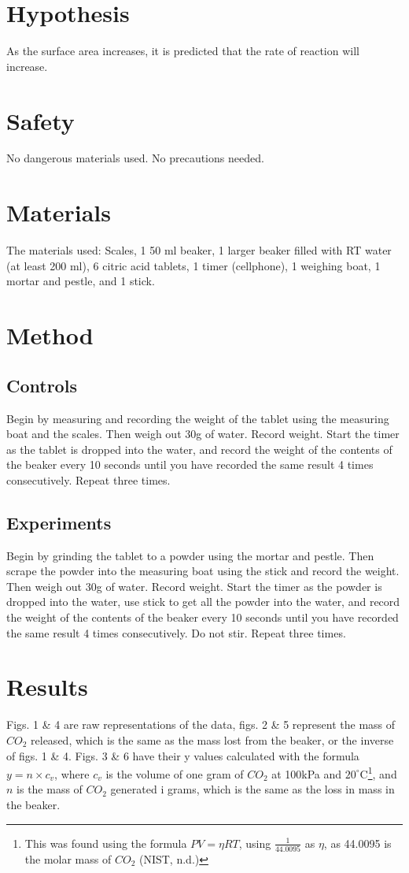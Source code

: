 \documentclass[twoside]{article}
\begin{document}
\section*{Hypothesis}
		As the surface area increases, it is predicted that the rate of reaction will increase.

\section*{Safety}
		No dangerous materials used. No precautions needed.

\section*{Materials}
		The materials used: Scales, 1 50 ml beaker, 1 larger beaker filled with RT water (at least 200 ml), 6 citric acid tablets, 1 timer (cellphone), 1 weighing boat, 1 mortar and pestle, and 1 stick.

\section*{Method}
	\subsection*{Controls}
			Begin by measuring and recording the weight of the tablet using the measuring boat and the scales. Then weigh out 30g of water. Record weight. Start the timer as the tablet is dropped into the water, and record the weight of the contents of the beaker every 10 seconds until you have recorded the same result 4 times consecutively. Repeat three times.

	\subsection*{Experiments}
			Begin by grinding the tablet to a powder using the mortar and pestle. Then scrape the powder into the measuring boat using the stick and record the weight. Then weigh out 30g of water. Record weight. Start the timer as the powder is dropped into the water, use stick to get all the powder into the water, and record the weight of the contents of the beaker every 10 seconds until you have recorded the same result 4 times consecutively. Do not stir. Repeat three times.
	\newpage
\section*{Results}
		Figs. 1 \& 4 are raw representations of the data, figs. 2 \& 5 represent the mass of $CO_2$ released, which is the same as the mass lost from the beaker, or the inverse of figs. 1 \& 4. Figs. 3 \& 6 have their y values calculated with the formula $y = n \times c_{v} $, where $c_{v}$ is the volume of one gram of $CO_2$ at 100kPa and $20^\circ$C\footnote{This was found using the formula $PV=\eta RT$, using $\frac{1}{44.0095}$ as $\eta$, as 44.0095 is the molar mass of $CO_2$ (NIST, n.d.)}, and $n$ is the mass of $CO_2$ generated i grams, which is the same as the loss in mass in the beaker.
\end{document}

